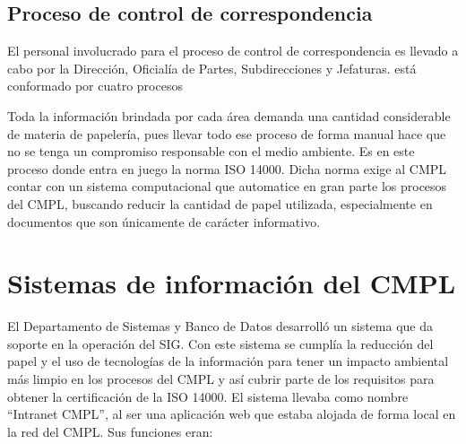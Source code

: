 	\subsection{Proceso de control de correspondencia}
	
	
	
	
	
	
	El personal involucrado para el proceso de control de correspondencia es llevado a cabo por la  Dirección, Oficialía de Partes, Subdirecciones y Jefaturas. está conformado por cuatro procesos 
	
	Toda la información brindada por cada área demanda una cantidad considerable de materia de papelería, pues llevar todo ese proceso de forma manual hace que no se tenga un compromiso responsable con el medio ambiente.  Es en este proceso donde entra en juego la norma ISO 14000. Dicha norma exige al CMPL contar con un sistema computacional que automatice en gran parte los procesos del CMPL, buscando reducir la cantidad de papel utilizada, especialmente en documentos que son únicamente de carácter informativo.\\
	
	\section{Sistemas de información del CMPL}
	El Departamento de Sistemas y Banco de Datos desarrolló un sistema que da soporte en la operación del SIG. Con este sistema se cumplía la reducción del papel y el uso de tecnologías de la información para tener un impacto ambiental más limpio en los procesos del CMPL  y así cubrir parte de los requisitos para obtener la certificación de la ISO 14000. El sistema llevaba como nombre ``Intranet CMPL'', al ser una aplicación web que estaba alojada de forma local en la red del CMPL. Sus funciones eran:\\
	
